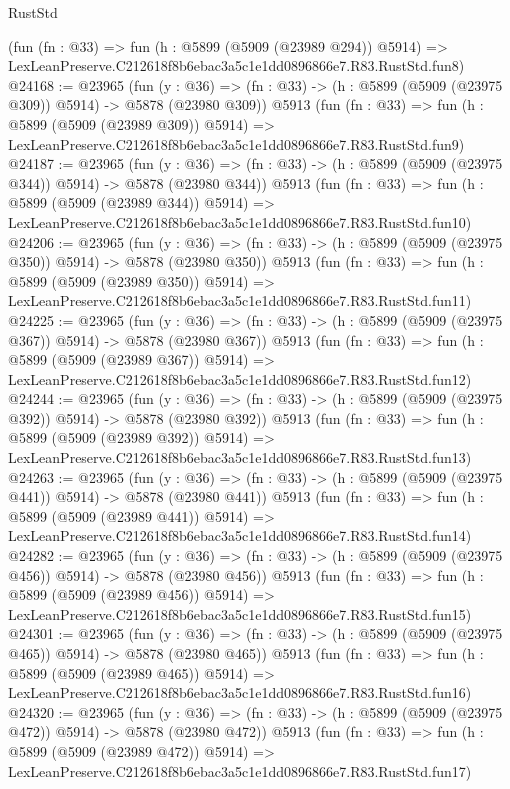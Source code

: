 \begin{lexlean}{RustStd}
\begin{coremodule}
{{    (fun (fn : @33) =>
    fun (h : @5899 (@5909 (@23989 @294)) @5914) =>
    LexLeanPreserve.C212618f8b6ebac3a5c1e1dd0896866e7.R83.RustStd.fun8)
@24168 := @23965
    (fun (y : @36) => (fn : @33) -> (h : @5899 (@5909 (@23975 @309)) @5914) -> @5878 (@23980 @309))
    @5913
    (fun (fn : @33) =>
    fun (h : @5899 (@5909 (@23989 @309)) @5914) =>
    LexLeanPreserve.C212618f8b6ebac3a5c1e1dd0896866e7.R83.RustStd.fun9)
@24187 := @23965
    (fun (y : @36) => (fn : @33) -> (h : @5899 (@5909 (@23975 @344)) @5914) -> @5878 (@23980 @344))
    @5913
    (fun (fn : @33) =>
    fun (h : @5899 (@5909 (@23989 @344)) @5914) =>
    LexLeanPreserve.C212618f8b6ebac3a5c1e1dd0896866e7.R83.RustStd.fun10)
@24206 := @23965
    (fun (y : @36) => (fn : @33) -> (h : @5899 (@5909 (@23975 @350)) @5914) -> @5878 (@23980 @350))
    @5913
    (fun (fn : @33) =>
    fun (h : @5899 (@5909 (@23989 @350)) @5914) =>
    LexLeanPreserve.C212618f8b6ebac3a5c1e1dd0896866e7.R83.RustStd.fun11)
@24225 := @23965
    (fun (y : @36) => (fn : @33) -> (h : @5899 (@5909 (@23975 @367)) @5914) -> @5878 (@23980 @367))
    @5913
    (fun (fn : @33) =>
    fun (h : @5899 (@5909 (@23989 @367)) @5914) =>
    LexLeanPreserve.C212618f8b6ebac3a5c1e1dd0896866e7.R83.RustStd.fun12)
@24244 := @23965
    (fun (y : @36) => (fn : @33) -> (h : @5899 (@5909 (@23975 @392)) @5914) -> @5878 (@23980 @392))
    @5913
    (fun (fn : @33) =>
    fun (h : @5899 (@5909 (@23989 @392)) @5914) =>
    LexLeanPreserve.C212618f8b6ebac3a5c1e1dd0896866e7.R83.RustStd.fun13)
@24263 := @23965
    (fun (y : @36) => (fn : @33) -> (h : @5899 (@5909 (@23975 @441)) @5914) -> @5878 (@23980 @441))
    @5913
    (fun (fn : @33) =>
    fun (h : @5899 (@5909 (@23989 @441)) @5914) =>
    LexLeanPreserve.C212618f8b6ebac3a5c1e1dd0896866e7.R83.RustStd.fun14)
@24282 := @23965
    (fun (y : @36) => (fn : @33) -> (h : @5899 (@5909 (@23975 @456)) @5914) -> @5878 (@23980 @456))
    @5913
    (fun (fn : @33) =>
    fun (h : @5899 (@5909 (@23989 @456)) @5914) =>
    LexLeanPreserve.C212618f8b6ebac3a5c1e1dd0896866e7.R83.RustStd.fun15)
@24301 := @23965
    (fun (y : @36) => (fn : @33) -> (h : @5899 (@5909 (@23975 @465)) @5914) -> @5878 (@23980 @465))
    @5913
    (fun (fn : @33) =>
    fun (h : @5899 (@5909 (@23989 @465)) @5914) =>
    LexLeanPreserve.C212618f8b6ebac3a5c1e1dd0896866e7.R83.RustStd.fun16)
@24320 := @23965
    (fun (y : @36) => (fn : @33) -> (h : @5899 (@5909 (@23975 @472)) @5914) -> @5878 (@23980 @472))
    @5913
    (fun (fn : @33) =>
    fun (h : @5899 (@5909 (@23989 @472)) @5914) =>
    LexLeanPreserve.C212618f8b6ebac3a5c1e1dd0896866e7.R83.RustStd.fun17)
}}
\end{coremodule}
\end{lexlean}
